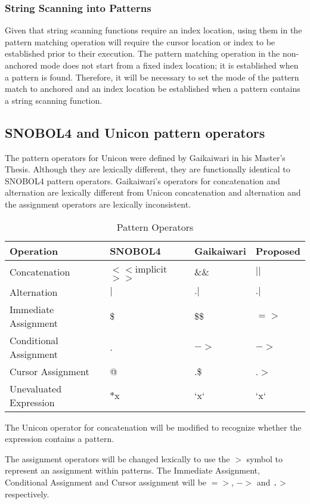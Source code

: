 \documentclass{article}
\begin{document}
\subsubsection{String Scanning into Patterns}
Given that string scanning functions require an index location, using them in the pattern matching operation will require the cursor location or index to be established prior to their execution.  The pattern matching operation in the non-anchored mode does not start from a fixed index location; it is established when a pattern is found.  Therefore, it will be necessary to set the mode of the pattern match to anchored and an index location be established when a pattern contains a string scanning function.

\subsection{SNOBOL4 and Unicon pattern operators}
The pattern operators for Unicon were defined by Gaikaiwari in his Master's Thesis.  Although they are lexically different, they are functionally identical to SNOBOL4 pattern operators.  Gaikaiwari's operators for concatenation and alternation are lexically different from Unicon concatenation and alternation and the assignment operators are lexically inconsistent.  

\begin{table}[ht]
	\caption{Pattern Operators}
	\centering
	\begin{tabular}{|l|l|l|l|}
		\hline\hline
		Operation & SNOBOL4 & Gaikaiwari & Proposed\\
		\hline
		Concatenation & $<<$implicit$>>$ & \&\& & $||$ \\
		Alternation & $|$ & $.|$ & $.|$ \\
		\hline
		Immediate Assignment & \$ & \$\$ & $=>$ \\
		Conditional Assignment & . & $->$ & $->$\\
		Cursor Assignment & @ & .\$ & .$>$ \\
		\hline
		Unevaluated Expression & $*$x & `x` & `x` \\
		\hline
	\end{tabular}
\end{table}

The Unicon operator for concatenation will be modified to recognize whether the expression contains a pattern.

The assignment operators will be changed lexically to use the \texttt{$>$} symbol to represent an assignment within patterns.  The Immediate Assignment, Conditional Assignment and Cursor assignment will be \texttt{$=>$}, \texttt{$->$} and \texttt{.$>$} respectively.
\end{document}
